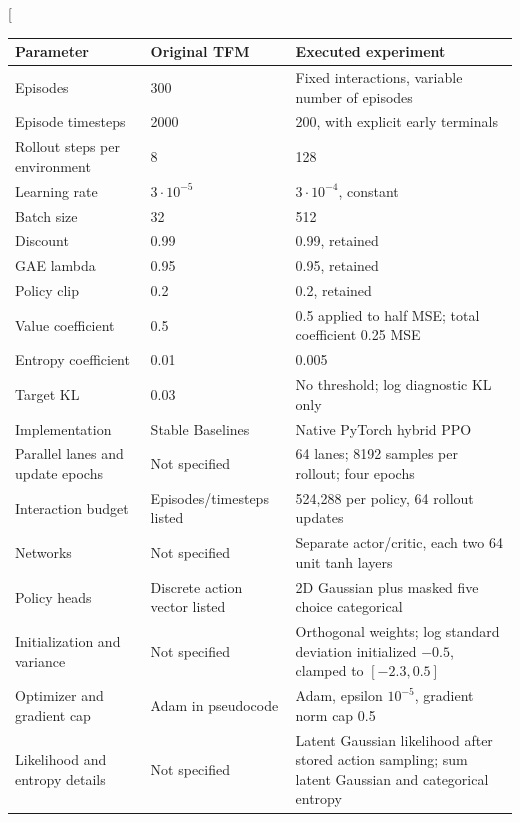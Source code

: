 \twocolumn[{\centering\footnotesize
{}
\label{tab:ppocomparison}
\begin{tabular}{@{}p{}p{}p{}@{}}
\toprule
Parameter & Original TFM & Executed experiment \\
\midrule
Episodes & 300 & Fixed interactions, variable number of episodes \\
Episode timesteps & 2000 & 200, with explicit early terminals \\
Rollout steps per environment & 8 & 128 \\
Learning rate & $3\cdot10^{-5}$ & $3\cdot10^{-4}$, constant \\
Batch size & 32 & 512 \\
Discount & 0.99 & 0.99, retained \\
GAE lambda & 0.95 & 0.95, retained \\
Policy clip & 0.2 & 0.2, retained \\
Value coefficient & 0.5 & 0.5 applied to half MSE; total coefficient 0.25 MSE \\
Entropy coefficient & 0.01 & 0.005 \\
Target KL & 0.03 & No threshold; log diagnostic KL only \\
\midrule
Implementation & Stable Baselines & Native PyTorch hybrid PPO \\
Parallel lanes and update epochs & Not specified & 64 lanes; 8192 samples per rollout; four epochs \\
Interaction budget & Episodes/timesteps listed & 524,288 per policy, 64 rollout updates \\
Networks & Not specified & Separate actor/critic, each two 64 unit tanh layers \\
Policy heads & Discrete action vector listed & 2D Gaussian plus masked five choice categorical \\
Initialization and variance & Not specified & Orthogonal weights; log standard deviation initialized $-0.5$,
clamped to $[-2.3,0.5]$ \\
Optimizer and gradient cap & Adam in pseudocode & Adam, epsilon $10^{-5}$, gradient norm cap 0.5 \\
Likelihood and entropy details & Not specified & Latent Gaussian likelihood after stored action sampling;
sum latent Gaussian and categorical entropy \\

\end{tabular}}
